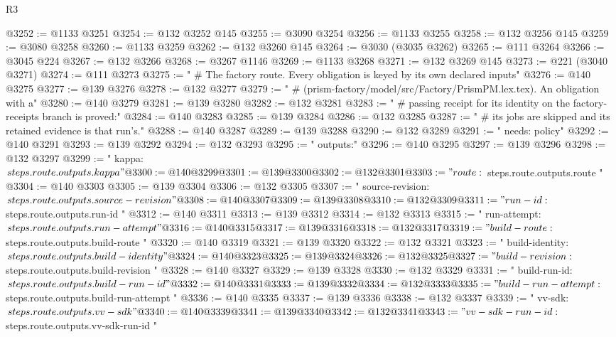 \begin{lexlean}{R3}
\begin{coremodule}
@3252 := @1133 @3251
@3254 := @132 @3252 @145
@3255 := @3090 @3254
@3256 := @1133 @3255
@3258 := @132 @3256 @145
@3259 := @3080 @3258
@3260 := @1133 @3259
@3262 := @132 @3260 @145
@3264 := @3030 (@3035 @3262)
@3265 := @111 @3264
@3266 := @3045 @224
@3267 := @132 @3266
@3268 := @3267 @1146
@3269 := @1133 @3268
@3271 := @132 @3269 @145
@3273 := @221 (@3040 @3271)
@3274 := @111 @3273
@3275 := "  # The factory route. Every obligation is keyed by its own declared inputs"
@3276 := @140 @3275
@3277 := @139 @3276
@3278 := @132 @3277
@3279 := "  # (prism-factory/model/src/Factory/PrismPM.lex.tex). An obligation with a"
@3280 := @140 @3279
@3281 := @139 @3280
@3282 := @132 @3281
@3283 := "  # passing receipt for its identity on the factory-receipts branch is proved:"
@3284 := @140 @3283
@3285 := @139 @3284
@3286 := @132 @3285
@3287 := "  # its jobs are skipped and its retained evidence is that run's."
@3288 := @140 @3287
@3289 := @139 @3288
@3290 := @132 @3289
@3291 := "    needs: policy"
@3292 := @140 @3291
@3293 := @139 @3292
@3294 := @132 @3293
@3295 := "    outputs:"
@3296 := @140 @3295
@3297 := @139 @3296
@3298 := @132 @3297
@3299 := "      kappa: ${{ steps.route.outputs.kappa }}"
@3300 := @140 @3299
@3301 := @139 @3300
@3302 := @132 @3301
@3303 := "      route: ${{ steps.route.outputs.route }}"
@3304 := @140 @3303
@3305 := @139 @3304
@3306 := @132 @3305
@3307 := "      source-revision: ${{ steps.route.outputs.source-revision }}"
@3308 := @140 @3307
@3309 := @139 @3308
@3310 := @132 @3309
@3311 := "      run-id: ${{ steps.route.outputs.run-id }}"
@3312 := @140 @3311
@3313 := @139 @3312
@3314 := @132 @3313
@3315 := "      run-attempt: ${{ steps.route.outputs.run-attempt }}"
@3316 := @140 @3315
@3317 := @139 @3316
@3318 := @132 @3317
@3319 := "      build-route: ${{ steps.route.outputs.build-route }}"
@3320 := @140 @3319
@3321 := @139 @3320
@3322 := @132 @3321
@3323 := "      build-identity: ${{ steps.route.outputs.build-identity }}"
@3324 := @140 @3323
@3325 := @139 @3324
@3326 := @132 @3325
@3327 := "      build-revision: ${{ steps.route.outputs.build-revision }}"
@3328 := @140 @3327
@3329 := @139 @3328
@3330 := @132 @3329
@3331 := "      build-run-id: ${{ steps.route.outputs.build-run-id }}"
@3332 := @140 @3331
@3333 := @139 @3332
@3334 := @132 @3333
@3335 := "      build-run-attempt: ${{ steps.route.outputs.build-run-attempt }}"
@3336 := @140 @3335
@3337 := @139 @3336
@3338 := @132 @3337
@3339 := "      vv-sdk: ${{ steps.route.outputs.vv-sdk }}"
@3340 := @140 @3339
@3341 := @139 @3340
@3342 := @132 @3341
@3343 := "      vv-sdk-run-id: ${{ steps.route.outputs.vv-sdk-run-id }}"

\end{coremodule}
\end{lexlean}
